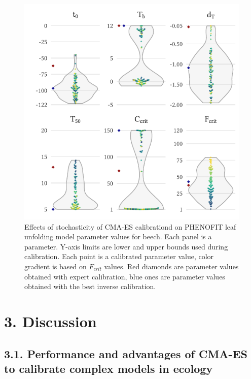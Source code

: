 \documentclass[11pt,]{article}
\begin{document}
\begin{figure}[H]

{\centering \includegraphics{figs/unfoldingplots} 

}

\caption{Effects of stochasticity of CMA-ES calibrationd on PHENOFIT leaf unfolding model parameter values for beech. Each panel is a parameter. Y-axis limits are lower and upper bounds used during calibration. Each point is a calibrated parameter value, color gradient is based on $F_{crit}$ values. Red diamonds are parameter values obtained with expert calibration, blue ones are parameter values obtained with the best inverse calibration.}\label{fig:unfoldingplots}
\end{figure}

\hypertarget{discussion}{%
\section{3. Discussion}\label{discussion}}

\hypertarget{performance-and-advantages-of-cma-es-to-calibrate-complex-models-in-ecology}{%
\subsection{3.1. Performance and advantages of CMA-ES to calibrate
complex models in
ecology}\label{performance-and-advantages-of-cma-es-to-calibrate-complex-models-in-ecology}}
\end{document}
